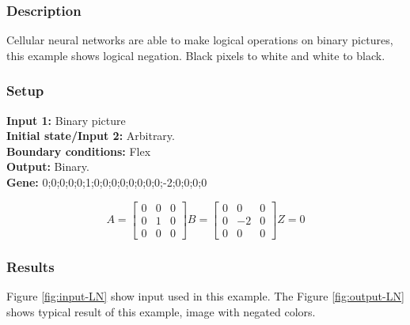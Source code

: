 \subsubsection{Description}
Cellular neural networks are able to make logical operations on binary pictures, this example shows logical negation. Black pixels to white and white to black. 
\subsubsection{Setup}

\textbf{Input 1:} Binary picture\\
\textbf{Initial state/Input 2:} Arbitrary.\\
\textbf{Boundary conditions:} Flex\\
\textbf{Output:} Binary.\\
\textbf{Gene:} 0;0;0;0;0;1;0;0;0;0;0;0;0;0;-2;0;0;0;0\\


\begin{minipage}{0.9\linewidth}
\begin{equation}
A =
\begin{bmatrix}
 0 &  0 &  0 \\
  0 &  1 &  0 \\
  0 &  0 &  0
\end{bmatrix}
B =
\begin{bmatrix}
 0 & 0 & 0 \\
 0 & -2 & 0 \\
 0 & 0 & 0
\end{bmatrix}
Z = 0
\end{equation}
\end{minipage}

\subsubsection{Results}
Figure \ref{fig:input-LN} show input used in this example. The Figure \ref{fig:output-LN} shows typical result of this example, image with negated colors. \\

